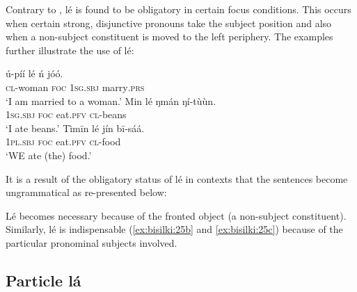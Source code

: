 \documentclass[output=paper,colorlinks,citecolor=brown]{langscibook}
\begin{document}
Contrary to \citet{Schwarz2009}, lé is found to be obligatory in certain focus conditions. This occurs when certain strong, disjunctive pronouns take the subject position and also when a non-subject constituent is moved to the left periphery. The examples  further illustrate the use of lé:

\ea%
    \label{ex:bisilki:24}
    \ea\label{ex:bisilki:24a}
    \gll    ú-píí		lé	ń		jóó.\\
            \textsc{cl-}woman	\textsc{foc}	\textsc{1sg.sbj}	marry\textsc{.prs}\\
    \glt    ‘I am married to a woman.’
    \ex\label{ex:bisilki:24b}
    \gll    Min	lé	ŋmán	ŋí-tùùn.\\
            \textsc{1sg.sbj}	\textsc{foc}	eat\textsc{.pfv}	\textsc{cl-}beans\\
    \glt    ‘I ate beans.’
    \ex\label{ex:bisilki:24c}
    \gll    Tìmīn		lé	jín		bī-sáá.\\
            \textsc{1pl.sbj}	\textsc{foc}	eat\textsc{.pfv}	\textsc{cl-}food\\
    \glt    ‘WE ate (the) food.’
    \z
\z

It is a result of the obligatory status of lé in contexts  that the sentences  become ungrammatical as re-presented  below:

\ea%
    \label{ex:bisilki:25}
    \z
\z

Lé  becomes necessary because of the fronted object (a non-subject constituent). Similarly, lé is indispensable (\ref{ex:bisilki:25b} and \ref{ex:bisilki:25c}) because of the particular pronominal subjects involved.

\subsection{Particle lá }\label{sec:bisilki:7.2}
\end{document}
